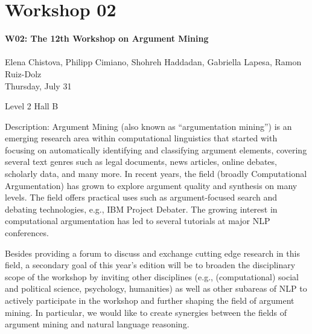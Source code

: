 \clearpage



\section[W02: The 12th Workshop on Argument Mining]{Workshop 02}
\label{workshop_2}

\begin{center}
    {\Large \textbf{W02: The 12th Workshop on Argument Mining}}\\
    \\


    Elena Chistova, Philipp Cimiano, Shohreh Haddadan, Gabriella Lapesa, Ramon Ruiz-Dolz \\                                                                                                                                                                                            

    Thursday, July 31
    
    Level 2 Hall B

\end{center}
	
Description: Argument Mining (also known as “argumentation mining”) is an emerging research area within computational linguistics that started with focusing on automatically identifying and classifying argument elements, covering several text genres such as legal documents, news articles, online debates, scholarly data, and many more. In recent years, the field (broadly Computational Argumentation) has grown to explore argument quality and synthesis on many levels. The field offers practical uses such as argument-focused search and debating technologies, e.g., IBM Project Debater. The growing interest in computational argumentation has led to several tutorials at major NLP conferences.

Besides providing a forum to discuss and exchange cutting edge research in this field, a secondary goal of this year's edition will be to broaden the disciplinary scope of the workshop by inviting other disciplines (e.g., (computational) social and political science, psychology, humanities) as well as other subareas of NLP to actively participate in the workshop and further shaping the field of argument mining. In particular, we would like to create synergies between the fields of argument mining and natural language reasoning.	

